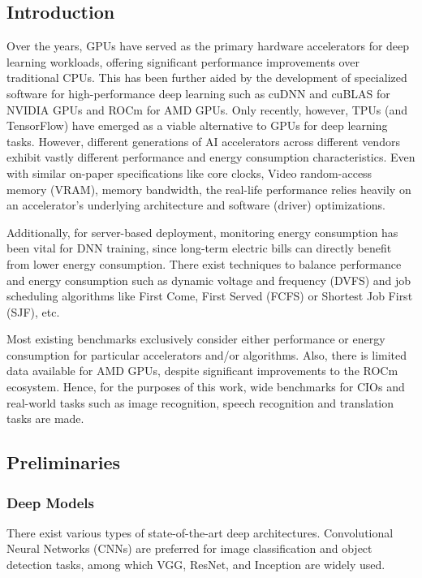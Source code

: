 \subsection{Introduction}
\label{subsec:introduction3}

Over the years, GPUs have served as the primary hardware accelerators for deep learning workloads,
offering significant performance improvements over traditional CPUs.
This has been further aided by the development of specialized software for high-performance deep learning such as cuDNN and cuBLAS for NVIDIA GPUs and ROCm for AMD GPUs.
Only recently, however, TPUs (and TensorFlow) have emerged as a viable alternative to GPUs for deep learning tasks.
However,
different generations of AI accelerators across different vendors exhibit vastly different performance and energy consumption characteristics.
Even with similar on-paper specifications like core clocks, Video random-access memory (VRAM), memory bandwidth,
the real-life performance relies heavily on an accelerator's underlying architecture and
software (driver) optimizations.

Additionally, for server-based deployment,
monitoring energy consumption has been vital for DNN training,
since long-term electric bills can directly benefit from lower energy consumption.
There exist techniques to balance performance and energy consumption such as dynamic voltage and frequency
(DVFS) and job scheduling algorithms like First Come, First Served (FCFS) or Shortest Job First (SJF)\cite{b2}, etc.

Most existing benchmarks exclusively consider either performance or energy consumption for particular accelerators and/or algorithms.
Also, there is limited data available for AMD GPUs, despite significant improvements to the ROCm ecosystem.
Hence, for the purposes of this work,
wide benchmarks for CIOs and real-world tasks such as image recognition,
speech recognition and translation tasks are made.

\subsection{Preliminaries}
\label{subsec:prelims}

\subsubsection{Deep Models}
There exist various types of state-of-the-art deep architectures.
Convolutional Neural Networks (CNNs) are preferred for image classification and object detection tasks,
among which VGG, ResNet, and Inception are widely used.

